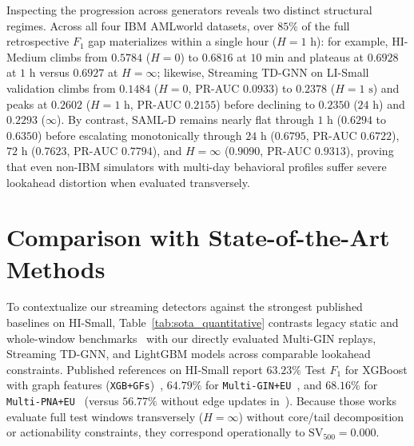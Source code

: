 \documentclass[pdflatex,sn-mathphys,Numbered]{sn-jnl}
\theoremstyle{thmstyleone}
\begin{document}
Inspecting the progression across generators reveals two distinct structural regimes. Across all four IBM AMLworld datasets, over $85\%$ of the full retrospective $F_1$ gap materializes within a single hour ($H = 1\text{ h}$): for example, HI-Medium climbs from $0.5784$ ($H = 0$) to $0.6816$ at $10\text{ min}$ and plateaus at $0.6928$ at $1\text{ h}$ versus $0.6927$ at $H = \infty$; likewise, Streaming TD-GNN on LI-Small validation climbs from $0.1484$ ($H = 0$, PR-AUC $0.0933$) to $0.2378$ ($H = 1\text{ s}$) and peaks at $0.2602$ ($H = 1\text{ h}$, PR-AUC $0.2155$) before declining to $0.2350$ ($24\text{ h}$) and $0.2293$ ($\infty$). By contrast, SAML-D remains nearly flat through $1\text{ h}$ ($0.6294$ to $0.6350$) before escalating monotonically through $24\text{ h}$ ($0.6795$, PR-AUC $0.6722$), $72\text{ h}$ ($0.7623$, PR-AUC $0.7794$), and $H = \infty$ ($0.9090$, PR-AUC $0.9313$), proving that even non-IBM simulators with multi-day behavioral profiles suffer severe lookahead distortion when evaluated transversely.

\section{Comparison with State-of-the-Art Methods}\label{sec:sota_comparison}

To contextualize our streaming detectors against the strongest published baselines on HI-Small, Table~\ref{tab:sota_quantitative} contrasts legacy static and whole-window benchmarks~\cite{altman2023ibmaml,egressy2024multigraph} with our directly evaluated Multi-GIN replays, Streaming TD-GNN, and LightGBM models across comparable lookahead constraints. Published references on HI-Small report $63.23\%$ Test $F_1$ for XGBoost with graph features (\texttt{XGB+GFs})~\cite{egressy2024multigraph}, $64.79\%$ for \texttt{Multi-GIN+EU}~\cite{egressy2024multigraph}, and $68.16\%$ for \texttt{Multi-PNA+EU}~\cite{egressy2024multigraph} (versus $56.77\%$ without edge updates in~\cite{altman2023ibmaml}). Because those works evaluate full test windows transversely ($H = \infty$) without core/tail decomposition or actionability constraints, they correspond operationally to $\text{SV}_{500} = 0.000$.
\end{document}
